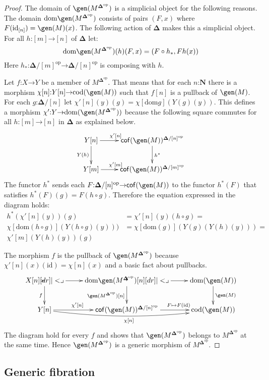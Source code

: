 \documentclass{amsart}
\theoremstyle{plain}
\theoremstyle{definition}
\newcommand\hide[1]{}
\newcommand\cat\mathcal
\newcommand\id{\mathrm{id}}
\newcommand\dom{\mathrm{dom}}
\newcommand\cod{\mathrm{cod}}
\newcommand\ri{^*}
\newcommand\nno{\mathbf N}
\newcommand\dual{^{\mathrm{op}}}
\newcommand\simCat{\mathbf\Delta}
\newcommand\s{^{\simCat\dual}}
\newcommand\of{\mathord:}
\renewcommand\to{\mathord\rightarrow}
\begin{document}
\newcommand\di{_*}
\begin{proof} %
The domain of $\gen(M\s)$ is a simplicial object for the following reasons. The domain $\dom\gen(M\s)$ consists of pairs $(F,x)$ where $F(\id_{[n]}) = \gen(M)(x)$. The following action of $\simCat$ makes this a simplicial object. For all $h\of[m]\to[n]$ of $\simCat$ let:
\[\dom\gen(M\s)(h)(F,x) = (F\circ h\di, Fh(x))\] Here $h\di\of\simCat/[m]\dual\to\simCat/[n]\dual$ is composing with $h$.

Let $f\of X\to Y$ be a member of $M\s$. That means that for each $n\of\nno$ there is a morphism $\chi[n]\of Y[n] \to \cod(\gen(M))$ such that $f[n]$ is a pullback of $\gen(M)$. For each $g\of \simCat/[n]$ let $\chi'[n](y)(g) = \chi[\dom g](Y(g)(y))$. This defines a morphism $\chi'\of Y\to \dom (\gen(M\s))$ because the following square commutes for all $h\of [m]\to [n]$ in $\simCat$ as explained below.
\[\xymatrix{
Y[n]\ar[d]_{Y(h)} \ar[r]^(.4){\chi'[n]} & \cof(\gen(M))^{\simCat/[n]\dual} \ar[d]^{h\ri}\\
Y[m] \ar[r]^(.4){\chi'[m]} & \cof(\gen(M))^{\simCat/[m]\dual}
}\]
The functor $h\ri$ sends each $F\of\simCat/[n]\dual\to \cof(\gen(M))$ to the functor $h\ri(F)$ that satisfies $h\ri(F)(g) = F(h\circ g)$. Therefore the equation expressed in the diagram holds:
\begin{align*}
h\ri(\chi'[n](y))(g) &= \chi'[n](y)(h\circ g) = \\
\chi[\dom (h\circ g)](Y(h\circ g)(y))) &= \chi[\dom (g)](Y(g)(Y(h)(y))) =\\
\chi'[m](Y(h)(y))(g)
\end{align*}

The morphism $f$ is the pullback of $\gen(M\s)$ because $\chi'[n](x)(\id) = \chi[n](x)$ and a basic fact about pullbacks.
\[\xymatrix{
X[n]\ar[d]_f\ar[r]\pb & \dom\gen(M\s)[n] \ar[r]\ar[d]_{\gen(M\s)[n]}\pb & \dom(\gen(M))\ar[d]^{\gen(M)} \\
Y[n] \ar[r]^(.4){\chi'[n]} \ar@/_2ex/[rr]_{\chi[n]} & \cof(\gen(M))^{\simCat/[n]\dual} \ar[r]^(.6){F\mapsto F(\id)} & \cod(\gen(M))
}\]
The diagram hold for every $f$ and shows that $\gen(M\s)$ belongs to $M\s$ at the same time. Hence $\gen(M\s)$ is a generic morphism of $M\s$.
\end{proof}\hide{ Even if we cannot build $\cof(\gen(M))\s$ in $\cat S$ that does mean the pullback is not a modest morphism. }

\subsection{Generic fibration}
\end{document}
